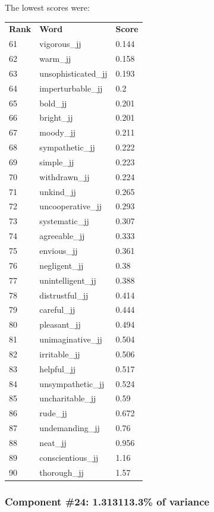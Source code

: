 \documentclass[10pt,letterpaper]{book}
\begin{document}
The lowest scores were:
\begin{tabular}{ l l l }
        \textbf{Rank} & \textbf{Word} & \textbf{Score} \\
        61 & vigorous\_jj & 0.144 \\
        62 & warm\_jj & 0.158 \\
        63 & unsophisticated\_jj & 0.193 \\
        64 & imperturbable\_jj & 0.2 \\
        65 & bold\_jj & 0.201 \\
        66 & bright\_jj & 0.201 \\
        67 & moody\_jj & 0.211 \\
        68 & sympathetic\_jj & 0.222 \\
        69 & simple\_jj & 0.223 \\
        70 & withdrawn\_jj & 0.224 \\
        71 & unkind\_jj & 0.265 \\
        72 & uncooperative\_jj & 0.293 \\
        73 & systematic\_jj & 0.307 \\
        74 & agreeable\_jj & 0.333 \\
        75 & envious\_jj & 0.361 \\
        76 & negligent\_jj & 0.38 \\
        77 & unintelligent\_jj & 0.388 \\
        78 & distrustful\_jj & 0.414 \\
        79 & careful\_jj & 0.444 \\
        80 & pleasant\_jj & 0.494 \\
        81 & unimaginative\_jj & 0.504 \\
        82 & irritable\_jj & 0.506 \\
        83 & helpful\_jj & 0.517 \\
        84 & unsympathetic\_jj & 0.524 \\
        85 & uncharitable\_jj & 0.59 \\
        86 & rude\_jj & 0.672 \\
        87 & undemanding\_jj & 0.76 \\
        88 & neat\_jj & 0.956 \\
        89 & conscientious\_jj & 1.16 \\
        90 & thorough\_jj & 1.57 \\
\end{tabular}
\subsubsection{Component \#24: 1.313113.3\% of variance}
\end{document}
